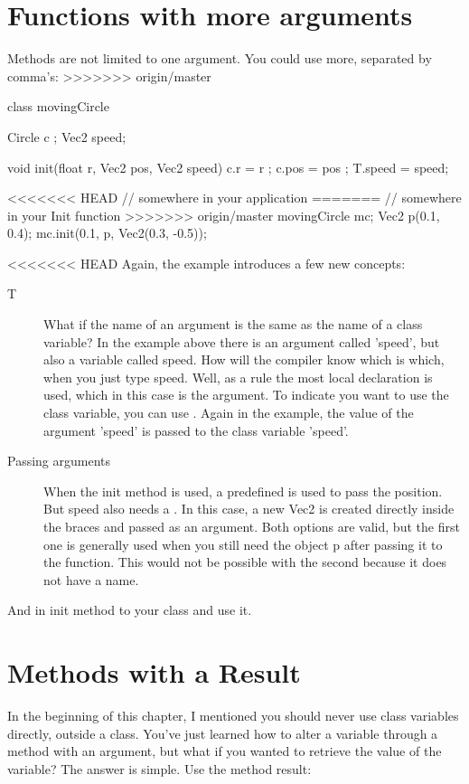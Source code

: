 \section{Functions with more arguments}
Methods are not limited to one argument. You could use more, separated by comma's:
>>>>>>> origin/master

\begin{code}
class movingCircle {
  Circle c    ;
  Vec2   speed;
  
  void init(float r, Vec2 pos, Vec2 speed) {
    c.r     = r    ;
    c.pos   = pos  ;
    T.speed = speed;
  }
}

<<<<<<< HEAD
// somewhere in your application
=======
// somewhere in your Init function
>>>>>>> origin/master
movingCircle mc;
Vec2 p(0.1, 0.4);
mc.init(0.1, p, Vec2(0.3, -0.5));
\end{code}

<<<<<<< HEAD
Again, the example introduces a few new concepts:
\begin{description}
\item[T] What if the name of an argument is the same as the name of a class variable? In the example above there is an argument called 'speed', but also a variable called speed. How will the compiler know which is which, when you just type speed. Well, as a rule the most local declaration is used, which in this case is the argument. To indicate you want to use the class variable, you can use . Again in the example, the value of the argument 'speed' is passed to the class variable 'speed'. 
\item[Passing arguments] When the init method is used, a predefined  is used to pass the position. But speed also needs a . In this case, a new Vec2 is created directly inside the braces and passed as an argument. Both options are valid, but the first one is generally used when you still need the object p after passing it to the function. This would not be possible with the second  because it does not have a name.
\end{description}

\begin{exercise}
And in init method to your class and use it.
\end{exercise}

\section{Methods with a Result}
In the beginning of this chapter, I mentioned you should never use class variables directly, outside a class. You've just learned how to alter a variable through a method with an argument, but what if you wanted to retrieve the value of the variable? The answer is simple. Use the method result:

